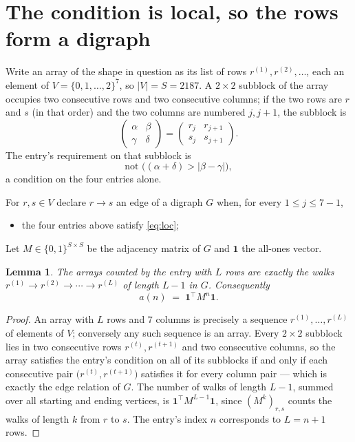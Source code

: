 \documentclass[11pt,a4paper]{article}
\theoremstyle{plain}
\newtheorem{lemma}[theorem]{Lemma}
\theoremstyle{definition}
\begin{document}
\section{The condition is local, so the rows form a digraph}

Write an array of the shape in question as its list of rows
$r^{(1)},r^{(2)},\dots$, each an element of
$V=\{0,1,\dots,2\}^{7}$, so $|V|=S=2187$. A $2\times2$ subblock of the array
occupies two consecutive rows and two consecutive columns; if the two rows are $r$
and $s$ (in that order) and the two columns are numbered $j,j+1$,
the subblock is
\[
\begin{pmatrix}\alpha&\beta\\\gamma&\delta\end{pmatrix}=\begin{pmatrix}r_j&r_{j+1}\\s_j&s_{j+1}\end{pmatrix}.
\]
The entry's requirement on that subblock is
\begin{equation}\label{eq:loc}
\text{not }\bigl((\alpha+\delta)>|\beta-\gamma|\bigr),
\end{equation}
a condition on the four entries alone.

For $r,s\in V$ declare $r\to s$ an edge of a digraph $G$ when, for every
$1\le j\le 7-1$,
\begin{itemize}
\item the four entries above satisfy \eqref{eq:loc};

\end{itemize}
Let $M\in\{0,1\}^{S\times S}$ be the adjacency matrix of $G$ and $\mathbf{1}$ the
all-ones vector.

\begin{lemma}\label{lem:walk}
The arrays counted by the entry with $L$ rows are exactly the walks
$r^{(1)}\to r^{(2)}\to\cdots\to r^{(L)}$ of length $L-1$ in $G$. Consequently
\[
a(n)\;=\;\mathbf{1}^{\!\top}M^{n}\mathbf{1} .
\]
\end{lemma}

\begin{proof}
An array with $L$ rows and $7$ columns is precisely a sequence
$r^{(1)},\dots,r^{(L)}$ of elements of $V$; conversely any such sequence is an array.
Every $2\times2$ subblock lies in two consecutive rows $r^{(t)},r^{(t+1)}$ and two
consecutive columns, so the array satisfies the entry's condition on all of its subblocks
if and only if each consecutive pair $\bigl(r^{(t)},r^{(t+1)}\bigr)$ satisfies it for
every column pair --- which is exactly the edge relation of $G$. The number of walks of
length $L-1$, summed over all starting and ending vertices, is
$\mathbf{1}^{\!\top}M^{L-1}\mathbf{1}$, since $(M^{k})_{r,s}$ counts the walks of
length $k$ from $r$ to $s$. The entry's index $n$ corresponds to $L=n+1$ rows.
\end{proof}
\end{document}
